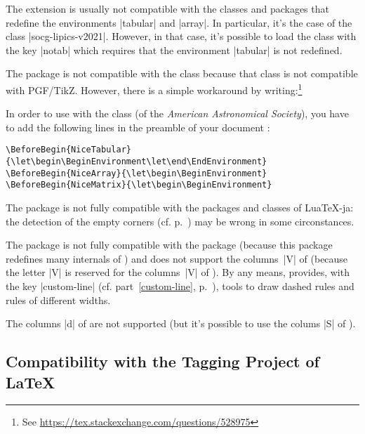 \documentclass[dvipsnames]{article}%
\begin{document}
\medskip
The extension  is usually not compatible with the classes and
packages that redefine the environments |{tabular}| and |{array}|. In
particular, it's the case of the class |socg-lipics-v2021|. However, in that
case, it's possible to load the class with the key |notab| which requires that
the environment |{tabular}| is not redefined.

\medskip

The package  is not compatible with the class 
because that class is not compatible with PGF/TikZ. However, there is a simple
workaround by writing:\footnote{See
 \url{https://tex.stackexchange.com/questions/528975}}\par\nobreak 




\medskip
In order to use  with the class 
(of the \emph{American Astronomical Society}), you have to
add the following lines in the preamble of your document :

\begin{Verbatim}
\end{Verbatim}


\medskip
The package  is not fully compatible with the packages and classes
of LuaTeX-ja: the detection of the empty corners (cf. p.~\pageref{corners})
may be wrong in some circonstances.

\medskip
The package  is not fully compatible with the package
 (because this package redefines many internals of )
and does not support the columns~|V| of  (because the letter |V| is
reserved for the columns~|V| of ). By any means, 
provides, with the key |custom-line| (cf. part~\ref{custom-line},
p.~\pageref{custom-line}), tools to draw dashed rules and rules of different
widths. 

\bigskip
The columns |d| of  are not supported (but it's possible to use
the colums |S| of ).


\subsection{Compatibility with the Tagging Project of LaTeX}
\end{document}
